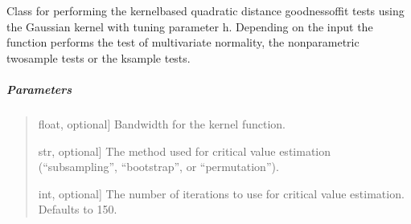 \documentclass[letterpaper,10pt,english,openany,oneside]{sphinxmanual}
\begin{document}
{{{{\begin{fulllineitems}
\label{\detokenize{api_reference/generated/QuadratiK.kernel_test.KernelTest:QuadratiK.kernel_test.KernelTest}}
\pysigstartsignatures
{}
\pysigstopsignatures
\sphinxAtStartPar
Class for performing the kernel\sphinxhyphen{}based quadratic distance goodness\sphinxhyphen{}of\sphinxhyphen{}fit tests using
the Gaussian kernel with tuning parameter h. Depending on the input  the function performs
the test of multivariate normality, the non\sphinxhyphen{}parametric two\sphinxhyphen{}sample tests or the k\sphinxhyphen{}sample tests.


\subparagraph{Parameters}
\label{\detokenize{api_reference/generated/QuadratiK.kernel_test.KernelTest:parameters}}\begin{quote}
\begin{description}
\sphinxlineitem{h}{[}float, optional{]}
\sphinxAtStartPar
Bandwidth for the kernel function.

\sphinxlineitem{method}{[}str, optional{]}
\sphinxAtStartPar
The method used for critical value estimation (“subsampling”, “bootstrap”,
or “permutation”).

\sphinxlineitem{num\_iter}{[}int, optional{]}
\sphinxAtStartPar
The number of iterations to use for critical value estimation. Defaults to 150.


\end{description}
\end{quote}
\end{fulllineitems}}}}}
\end{document}
